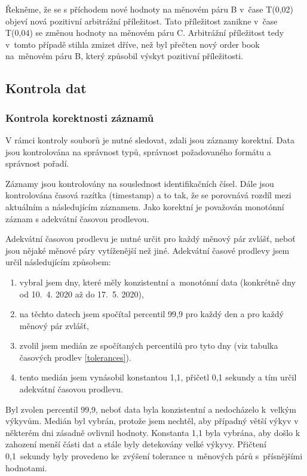 \documentclass[thesis=B,czech]{FITthesis}[2019/03/21]
\begin{document}
Řekněme, že se s příchodem nové hodnoty na měnovém páru B v~čase T(0,02) objeví nová pozitivní arbitrážní příležitost. Tato příležitost zanikne v~čase T(0,04) se změnou hodnoty na měnovém páru C. Arbitrážní příležitost tedy v~tomto případě stihla zmizet dříve, než byl přečten nový order book na~měnovém páru B, který způsobil výskyt pozitivní příležitosti. 

\subsection{Kontrola dat}
\subsubsection{Kontrola korektnosti záznamů}
\label{section:kontrola_korektnosti_zaznamu}
V rámci kontroly souborů je nutné sledovat, zdali jsou záznamy korektní. Data jsou kontrolována na správnost typů, správnost požadovaného formátu a správnost pořadí.

Záznamy jsou kontrolovány na souslednost identifikačních čísel. Dále jsou kontrolována časová razítka (timestamp) a to tak, že se porovnává rozdíl mezi aktuálním a následujícím záznamem. Jako korektní je považován monotónní záznam s adekvátní časovou prodlevou. 

Adekvátní časovou prodlevu je nutné určit pro každý měnový pár zvlášť, neboť jsou nějaké měnové páry vytíženější než jiné. Adekvátní časové prodlevy jsem určil následujícím způsobem:

\begin{enumerate}
    \item vybral jsem dny, které měly konzistentní a~monotónní data (konkrétně dny od 10.~4. 2020 až do 17.~5. 2020),
    \item na těchto datech jsem spočítal percentil 99,9 pro každý den a pro každý měnový pár zvlášť,
    \item zvolil jsem medián ze spočítaných percentilů pro tyto dny (viz tabulka časových prodlev \ref{tolerances}).
    \item tento medián jsem vynásobil konstantou 1,1, přičetl 0,1 sekundy a tím určil adekvátní časovou prodlevu.
\end{enumerate}

Byl zvolen percentil 99,9, neboť data byla konzistentní a nedocházelo k~velkým výkyvům. Medián byl vybrán, protože jsem nechtěl, aby případný větší výkyv v některém dni zásadně ovlivnil hodnoty. Konstanta 1,1 byla vybrána, aby došlo k zahození menší části dat a stále byly detekovány velké výkyvy. Přičtení 0,1~sekundy byly provedeno ke~zvýšení tolerance u~měnových párů s~přísnějšími hodnotami.
\end{document}
